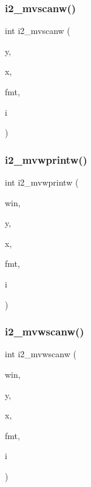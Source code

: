 \mbox{\label{C-macros_8c_ac3ddc9a07837b44a0d66ef085f764609}} 
\subsubsection{\texorpdfstring{i2\+\_\+mvscanw()}{i2\_mvscanw()}}
{\footnotesize\ttfamily int i2\+\_\+mvscanw (\begin{DoxyParamCaption}\item[{int}]{y,  }\item[{int}]{x,  }\item[{char $\ast$}]{fmt,  }\item[{short $\ast$}]{i }\end{DoxyParamCaption})}

\mbox{\label{C-macros_8c_a880d70f3a8db453d86b23072715762cc}} 
\subsubsection{\texorpdfstring{i2\+\_\+mvwprintw()}{i2\_mvwprintw()}}
{\footnotesize\ttfamily int i2\+\_\+mvwprintw (\begin{DoxyParamCaption}\item[{W\+I\+N\+D\+OW $\ast$}]{win,  }\item[{int}]{y,  }\item[{int}]{x,  }\item[{const char $\ast$}]{fmt,  }\item[{short}]{i }\end{DoxyParamCaption})}

\mbox{\label{C-macros_8c_aa6f3d74bf85893265213c40cb5b732e6}} 
\subsubsection{\texorpdfstring{i2\+\_\+mvwscanw()}{i2\_mvwscanw()}}
{\footnotesize\ttfamily int i2\+\_\+mvwscanw (\begin{DoxyParamCaption}\item[{W\+I\+N\+D\+OW $\ast$}]{win,  }\item[{int}]{y,  }\item[{int}]{x,  }\item[{char $\ast$}]{fmt,  }\item[{short $\ast$}]{i }\end{DoxyParamCaption})}

